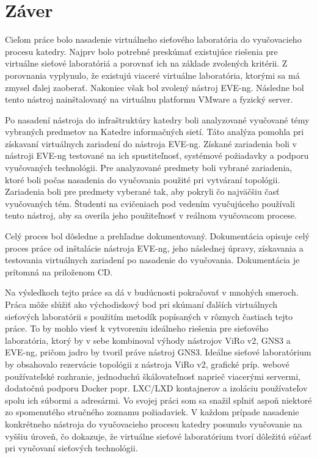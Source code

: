 \chapter{Záver}

Cieľom práce bolo nasadenie virtuálneho sieťového laboratória do vyučovacieho procesu katedry. Najprv bolo potrebné preskúmať existujúce riešenia pre virtuálne sieťové laboratóriá a porovnať ich na základe zvolených kritérii. Z porovnania vyplynulo, že existujú viaceré virtuálne laboratória, ktorými sa má zmysel ďalej zaoberať. Nakoniec však bol zvolený nástroj EVE-ng. Následne bol tento nástroj nainštalovaný na virtuálnu platformu VMware a fyzický server.

Po nasadení nástroja do infraštruktúry katedry boli analyzované vyučované témy vybraných predmetov na Katedre informačných sietí. Táto analýza pomohla pri získavaní virtuálnych zariadení do nástroja EVE-ng. Získané zariadenia boli v nástroji EVE-ng testované na ich spustiteľnosť, systémové požiadavky a podporu vyučovaných technológii. Pre analyzované predmety boli vybrané zariadenia, ktoré boli počas nasadenia do vyučovania použité pri vytváraní topológii. Zariadenia boli pre predmety vyberané tak, aby pokryli čo najväčšiu časť vyučovaných tém. Študenti na cvičeniach pod vedením vyučujúceho používali tento nástroj, aby sa overila jeho použiteľnosť v reálnom vyučovacom procese.

Celý proces bol dôsledne a prehľadne dokumentovaný. Dokumentácia opisuje celý proces práce od inštalácie nástroja EVE-ng, jeho následnej úpravy, získavania a testovania virtuálnych zariadení po nasadenie do vyučovania. Dokumentácia je prítomná na priloženom CD.

Na výsledkoch tejto práce sa dá v budúcnosti pokračovať v mnohých smeroch. Práca môže slúžiť ako východiskový bod pri skúmaní ďalších virtuálnych sieťových laboratórii s použitím metodík popísaných v rôznych častiach tejto práce. To by mohlo viesť k vytvoreniu ideálneho riešenia pre sieťového laboratória, ktorý by v sebe kombinoval výhody nástrojov ViRo v2, GNS3 a EVE-ng, pričom jadro by tvoril práve nástroj GNS3. Ideálne sieťové laboratórium by obsahovalo rezervácie topológii z nástroja ViRo v2, grafické príp. webové používateľské rozhranie, jednoduchú škálovateľnosť naprieč viacerými servermi, dodatočnú podporu Docker popr. LXC/LXD kontajnerov a izoláciu používateľov spolu ich súbormi a adresármi. Vo svojej práci som sa snažil splniť aspoň niektoré zo spomenutého stručného zoznamu požiadaviek. V každom prípade nasadenie konkrétneho nástroja do vyučovacieho procesu katedry posunulo vyučovanie na vyššiu úroveň, čo dokazuje, že virtuálne sieťové laboratórium tvorí dôležitú súčasť pri vyučovaní sieťových technológii.